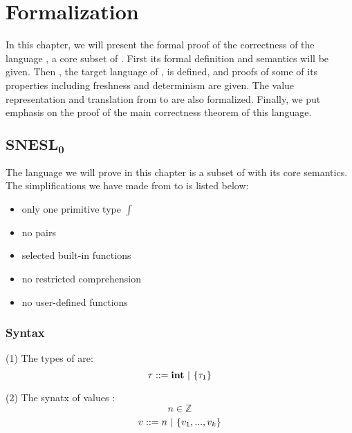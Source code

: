 
\chapter{Formalization}
\def\Eval#1#2#3{#1 \Env #2 \Eva #3 } 


\def\Type#1#2#3{#1 \Env #2 : #3 } 
\def\Typef#1#2#3{#1 : (#2) \rightarrow #3}
\def\TypeV#1#2{#1 : #2}

\def\ValRep#1#2#3{ #1 \triangleright_{#2} #3}


\def\wf#1{\Vdash #1}

\def\PRName#1{\textsc{I-#1}}
\def\MI{\mathcal{I}}  %



In this chapter, we will present the formal proof of the correctness of the language \fmsnesl, a core subset of \mysnesl.
First its formal definition and semantics will be given.
Then \fmsvcode, the target language of \fmsnesl, is defined, and proofs of some of its properties including freshness and determinism are given.
The value representation and translation from \fmsnesl to \fmsvcode are also formalized.
Finally, we put emphasis on the proof of the main correctness theorem of this language.

\section{$\mathbf{SNESL_0}$}

The language \fmsnesl we will prove in this chapter is a subset of \mysnesl with its core semantics. 
The simplifications we have made from \mysnesl to \fmsnesl is listed below:
\begin{itemize}
	\item only one primitive type $\int$ 
	\item no pairs
	\item selected built-in functions 
	\item no restricted comprehension
	\item no user-defined functions
\end{itemize}


\subsection{Syntax}

\noindent (1) The types of \fmsnesl are: 
$$\tau ::= \mathbf{int} \ | \ \{\tau_1\}$$

\noindent (2) The synatx of \fmsnesl values : 
$$ n \in \mathbb{Z} $$
$$ v::= n \ | \ \{ v_1,...,v_k \}$$

